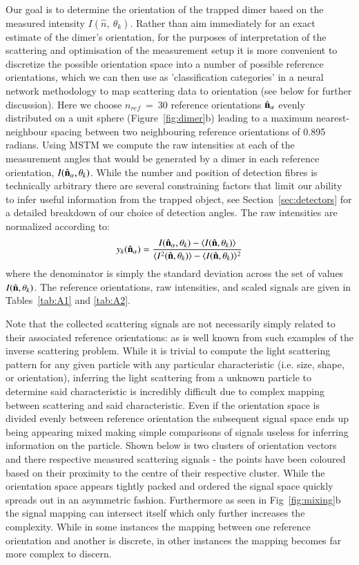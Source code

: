 \documentclass[final,  3p]{elsarticle}
\begin{document}
Our goal is to determine the orientation of the trapped dimer based on the measured intensity $I(\hat{n}, \ \theta_k)$. Rather than aim immediately for an exact estimate of the dimer's orientation, for the purposes of interpretation of the scattering and optimisation of the measurement setup it is more convenient to discretize the possible orientation space into a number of possible reference orientations, which we can then use as 'classification categories' in a neural network methodology to map scattering data to orientation (see below for further discussion).  Here we choose $\textit{n}_{ref} \ = \ 30$ reference orientations $\hat{\bf n}_{\alpha}$  evenly distributed on a unit sphere \cite{Rey2006} (Figure~\ref{fig:dimer}b) leading to a maximum nearest-neighbour spacing between two neighbouring reference orientations of 0.895 radians. Using MSTM we compute the raw intensities at each of the measurement angles that would be generated by a dimer in each reference orientation, $I(\hat{\bf n}_{\alpha}, \theta_k)$. While the number and position of detection fibres is technically arbitrary there are several constraining factors that limit our ability to infer useful information from the trapped object, see Section~\ref{sec:detectors} for a detailed breakdown of our choice of detection angles. The raw intensities are normalized according to:
\begin{align}
\label{eq:scale}
  y_k(\hat{\bf n}_\alpha)
  = 
  \frac{I(\hat{\bf n}_\alpha, \theta_k) - \langle I(\hat{\bf n},\theta_k) \rangle } 
  {\langle I^2(\hat{\bf n},\theta_k) \rangle -\langle I(\hat{\bf n}, \theta_k)\rangle^2}
\end{align}
where the denominator is simply the standard deviation across the set of values $I(\hat{\bf n}, \theta_k)$. The reference orientations, raw intensities, and scaled signals are given in Tables~\ref{tab:A1} and \ref{tab:A2}. 

Note that the collected scattering signals are not necessarily simply related to their associated reference orientations: as is well known from such examples of the inverse scattering problem. While it is trivial to compute the light scattering pattern for any given particle with any particular characteristic (i.e. size, shape, or orientation), inferring the light scattering from a unknown particle to determine said characteristic is incredibly difficult due to complex mapping between scattering and said characteristic. Even if the orientation space is divided evenly between reference orientation the subsequent signal space ends up being appearing mixed making simple comparisons of signals useless for inferring information on the particle. Shown below is two clusters of orientation vectors and there respective measured scattering signals - the points have been coloured based on their proximity to the centre of their respective cluster. While the orientation space appears tightly packed and ordered the signal space quickly spreads out in an asymmetric fashion. Furthermore as seen in Fig~\ref{fig:mixing}b the signal mapping can intersect itself which only further increases the complexity. While in some instances the mapping between one reference orientation and another is discrete, in other instances the mapping becomes far more complex to discern. 
\end{document}
